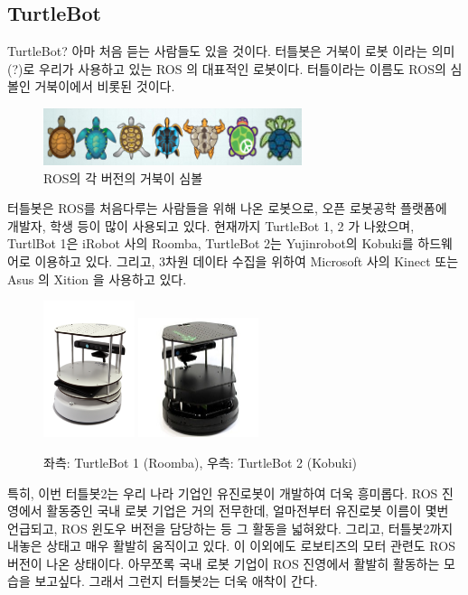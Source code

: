 \subsection{TurtleBot}

TurtleBot? 아마 처음 듣는 사람들도 있을 것이다. 터틀봇은 거북이 로봇 이라는 의미(?)로 우리가 사용하고 있는 ROS 의 대표적인 로봇이다. 터틀이라는 이름도 ROS의 심볼인 거북이에서 비롯된 것이다. 

\begin{figure}[h]
\centering\includegraphics[width=0.5\columnwidth]{pictures/chapter10/turtle_icons.png}
\caption{ROS의 각 버전의 거북이 심볼}
\end{figure}

터틀봇은 ROS를 처음다루는 사람들을 위해 나온 로봇으로, 오픈 로봇공학 플랫폼에 개발자, 학생 등이 많이 사용되고 있다. 현재까지 TurtleBot 1, 2 가 나왔으며, TurtlBot 1은 iRobot 사의 Roomba, TurtleBot 2는 Yujinrobot의 Kobuki를 하드웨어로 이용하고 있다. 그리고, 3차원 데이타 수집을 위하여 Microsoft 사의 Kinect 또는 Asus 의 Xition 을 사용하고 있다.

\begin{figure}[h]
\centering\includegraphics[height=40mm]{pictures/chapter10/turtlebot1.png}
\centering\includegraphics[height=35mm]{pictures/chapter10/turtlebot2.jpg}
\caption{좌측: TurtleBot 1 (Roomba), 우측: TurtleBot 2 (Kobuki)}
\end{figure}

특히, 이번 터틀봇2는 우리 나라 기업인 유진로봇이 개발하여 더욱 흥미롭다. ROS 진영에서 활동중인 국내 로봇 기업은 거의 전무한데, 얼마전부터 유진로봇 이름이 몇번 언급되고, ROS 윈도우 버전을 담당하는 등 그 활동을 넓혀왔다. 그리고, 터틀봇2까지 내놓은 상태고 매우 활발히 움직이고 있다. 이 이외에도 로보티즈의 모터 관련도 ROS 버전이 나온 상태이다. 아무쪼록 국내 로봇 기업이 ROS 진영에서 활발히 활동하는 모습을 보고싶다. 그래서 그런지 터틀봇2는 더욱 애착이 간다.

